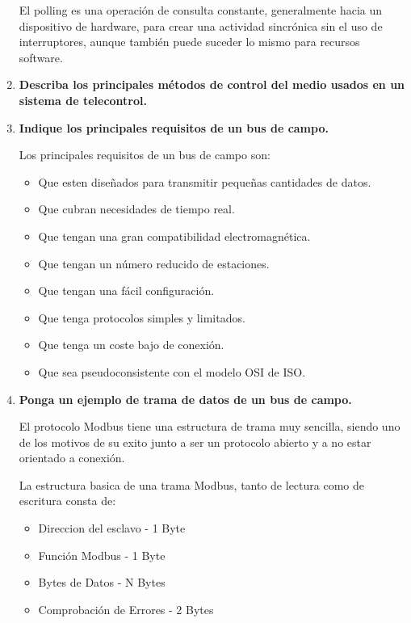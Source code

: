 \documentclass[10pt,a4paper,spanish]{article}
\begin{document}
\begin{enumerate}
    \noindent
    El polling es una operación de consulta constante, generalmente hacia un dispositivo de hardware, para crear una actividad sincrónica sin el uso de interruptores, aunque también puede suceder lo mismo para recursos software.

    \item \textbf{Describa los principales métodos de control del medio usados en un sistema de telecontrol.}



    \newpage
    \item \textbf{Indique los principales requisitos de un bus de campo.}

    \noindent
    Los principales requisitos de un bus de campo son:
    \begin{itemize}
      \item Que esten diseñados para transmitir pequeñas cantidades de datos.
      \item Que cubran necesidades de tiempo real.
      \item Que tengan una gran compatibilidad electromagnética.
      \item Que tengan un número reducido de estaciones.
      \item Que tengan una fácil configuración.
      \item Que tenga protocolos simples y limitados.
      \item Que tenga un coste bajo de conexión.
      \item Que sea pseudoconsistente con el modelo OSI de ISO.
    \end{itemize}

    \item \textbf{Ponga un ejemplo de trama de datos de un bus de campo.}

    \noindent
    El protocolo Modbus tiene una estructura de trama muy sencilla, siendo uno de los motivos de su exito junto a ser un protocolo abierto y a no estar orientado a conexión.

    La estructura basica de una trama Modbus, tanto de lectura como de escritura consta de:
    \begin{itemize}
      \item Direccion del esclavo - 1 Byte
      \item Función Modbus - 1 Byte
      \item Bytes de Datos - N Bytes
      \item Comprobación de Errores - 2 Bytes
    \end{itemize}
  \end{enumerate}
\end{document}

